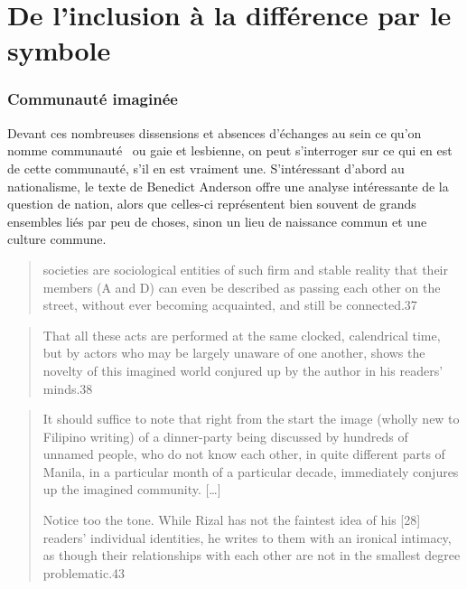 
\chapter{De l'inclusion à la différence par le symbole}
\label{cha:de_l_inclusion_la_diff_rence_par_le_symbole}





\subsection{Communauté imaginée}
\label{sub:communaut_imagin_e}
Devant ces nombreuses dissensions et absences d'échanges au sein ce qu'on nomme communauté~\lgbt{} ou gaie et lesbienne, on peut s'interroger sur ce qui en est de cette communauté, s'il en est vraiment une.
S'intéressant d'abord au nationalisme, le texte de Benedict Anderson offre une analyse intéressante de la question de nation, alors que celles-ci représentent bien souvent de grands ensembles liés par peu de choses, sinon un lieu de naissance commun et une culture commune.
\begin{quote}	
societies are sociological entities of such firm and stable reality that their members (A and D) can even be described as passing each other on the street, without ever becoming acquainted, and still be connected.37 \citep{Anderson1983}
\end{quote}

\begin{quote}
  That all these acts are performed at the same clocked, calendrical time, but   by actors who may be largely unaware of one another, shows the novelty of this imagined world conjured up by the author in his readers' minds.38
  \citep{Anderson1983}
\end{quote}

\begin{quote}
	
It should suffice to note that right from the start the image (wholly new to Filipino writing) of a dinner-party being discussed by hundreds of unnamed people, who do not know each other, in quite different parts of Manila, in a particular month of a particular decade, immediately conjures up the imagined community.
[\ldots]

Notice too the tone. 
While Rizal has not the faintest idea of his [28] readers' individual identities, he writes to them with an ironical intimacy, as though their relationships with each other are not in the smallest degree problematic.43
\end{quote}


